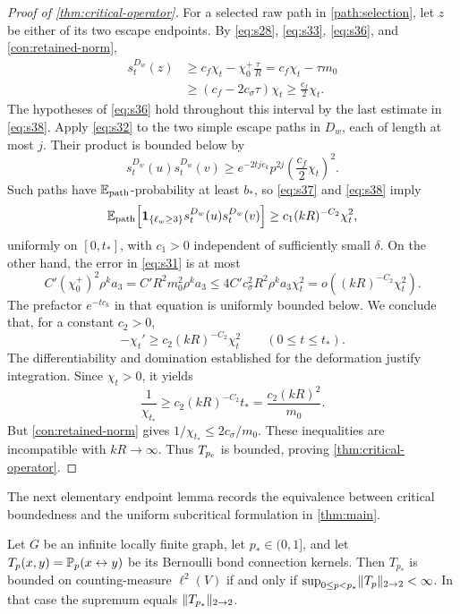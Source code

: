 \begin{proof}[Proof of \cref{thm:critical-operator}]
For a selected raw path in \cref{path:selection}, let $z$ be either
of its two escape endpoints. By \eqref{eq:s28}, \eqref{eq:s33},
\eqref{eq:s36}, and \eqref{con:retained-norm},
\[
 \begin{split}
 s_t^{D_w}(z)
 &\ge c_f\chi_t-\chi_0^+\frac{\tau}{R}
  =c_f\chi_t-\tau m_0\\
 &\ge(c_f-2c_\sigma\tau)\chi_t
  \ge\frac{c_f}{2}\chi_t.
 \end{split}
\]
The hypotheses of \eqref{eq:s36} hold throughout this interval by the
last estimate in \eqref{eq:s38}. Apply \eqref{eq:s32} to the two simple
escape paths in $D_w$, each of length at most $j$. Their product is
bounded below by
\[
 s_t^{D_w}(u)s_t^{D_w}(v)
 \ge e^{-2tjc_k}p^{2j}\left(\frac{c_f}{2}\chi_t\right)^2.
\]
Such paths have $\mathbb E_{\mathrm{path}}$-probability at least $b_*$, so
\eqref{eq:s37} and \eqref{eq:s38} imply
\begin{equation}
 \mathbb E_{\mathrm{path}}\!\left[
  \mathbf 1_{\{\ell_w\ge3\}}s_t^{D_w}(u)s_t^{D_w}(v)\right]
 \ge c_1(kR)^{-C_2}\chi_t^2,
 \label{con:positive-term}
\end{equation}
uniformly on $[0,t_*]$, with $c_1>0$ independent of sufficiently small
$\delta$. On the other hand, the error in \eqref{eq:s31} is at most
\[
 C'(\chi_0^+)^2\rho^ka_3
 =C'R^2m_0^2\rho^ka_3
 \le4C'c_\sigma^2R^2\rho^ka_3\chi_t^2
 =o((kR)^{-C_2}\chi_t^2).
\]
The prefactor $e^{-tc_k}$ in that equation is uniformly bounded below.
We conclude that, for a constant $c_2>0$,
\begin{equation}
 -\chi_t'\ge c_2(kR)^{-C_2}\chi_t^2
 \qquad(0\le t\le t_*).
 \label{con:differential-decrease}
\end{equation}
The differentiability and domination established for the deformation
justify integration. Since $\chi_t>0$, it yields
\[
 \frac1{\chi_{t_*}}
 \ge c_2(kR)^{-C_2}t_*
 =\frac{c_2(kR)^2}{m_0}.
\]
But \eqref{con:retained-norm} gives
$1/\chi_{t_*}\le2c_\sigma/m_0$. These inequalities are incompatible
with $kR\to\infty$. Thus $T_{{p_c}}$ is bounded, proving
\cref{thm:critical-operator}.
\end{proof}

The next elementary endpoint lemma records the equivalence between
critical boundedness and the uniform subcritical formulation in
\cref{thm:main}.

\begin{lemma}\label{con:critical-limit}
Let $G$ be an infinite locally finite graph, let $p_*\in(0,1]$, and let
$T_p(x,y)=\mathbb P_p(x\leftrightarrow y)$ be its Bernoulli bond connection
kernels. Then $T_{p_*}$ is bounded on counting-measure $\ell^2(V)$ if
and only if $\sup_{0\le p<p_*}\lVert T_p\rVert_{2\to2}<\infty$. In that case
the supremum equals $\lVert T_{p_*}\rVert_{2\to2}$.
\end{lemma}

